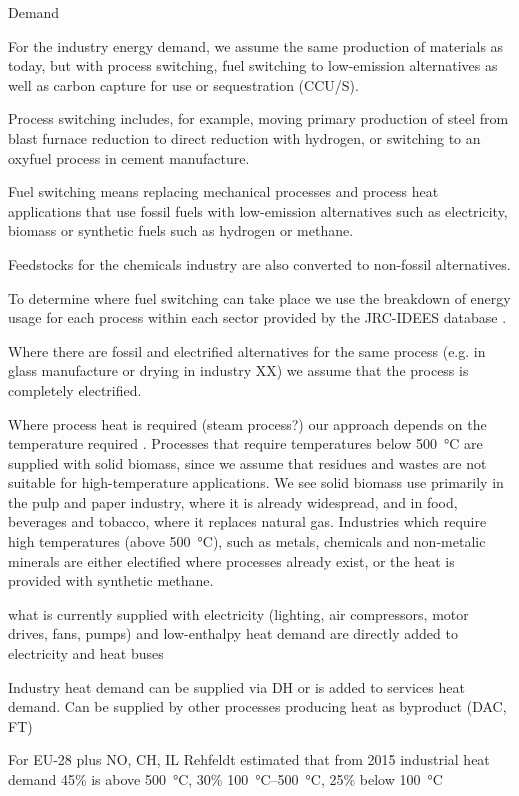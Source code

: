 Demand

For the industry energy demand, we assume the same
production of materials as today, but with process switching, fuel switching to
low-emission alternatives as well as carbon capture for use or sequestration
(CCU/S).

Process switching includes, for example, moving primary production of
steel from blast furnace reduction to direct reduction with hydrogen, or
switching to an oxyfuel process in cement manufacture.

Fuel switching means
replacing mechanical processes and process heat applications that use fossil
fuels with low-emission alternatives such as electricity, biomass or synthetic
fuels such as hydrogen or methane.

Feedstocks for the chemicals industry are
also converted to non-fossil alternatives.

To determine where fuel switching can take place we use the breakdown of energy
usage for each process within each sector provided by the JRC-IDEES database
.

Where there are fossil and electrified alternatives for the same
process (e.g. in glass manufacture or drying in industry XX) we assume that the
process is completely electrified.

Where process heat is required (steam
process?) our approach depends on the temperature required
. Processes that require temperatures below
\SI{500}{\celsius} are supplied with solid biomass, since we assume that residues and
wastes are not suitable for high-temperature applications. We see solid biomass
use primarily in the pulp and paper industry, where it is already widespread,
and in food, beverages and tobacco, where it replaces natural gas. Industries
which require high temperatures (above \SI{500}{\celsius}), such as metals, chemicals
and non-metalic minerals are either electified where processes already exist, or
the heat is provided with synthetic methane.

what is currently supplied with electricity (lighting, air compressors, motor drives, fans, pumps)
and low-enthalpy heat demand are directly added to electricity and heat buses

Industry heat demand can be supplied via DH or is added to services heat demand.
Can be supplied by other processes producing heat as byproduct (DAC, FT)

For EU-28 plus NO, CH, IL Rehfeldt estimated that from 2015 industrial heat demand
45\% is above \SI{500}{\celsius}, 30\% \SIrange{100}{500}{\celsius}, 25\% below \SI{100}{\celsius}

